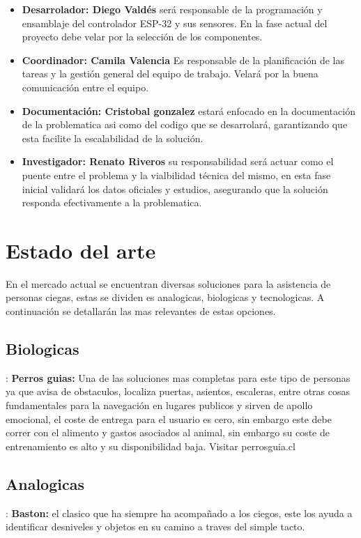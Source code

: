 \documentclass{article}
\begin{document}
    \begin{itemize}
        \item\textbf{Desarrolador: Diego Valdés} será responsable de la programación y ensamblaje del controlador ESP-32 y sus sensores. En la fase actual del proyecto debe velar por la selección de los componentes.
        \item\textbf{Coordinador: Camila Valencia} Es responsable de la planificación de las tareas y la gestión general del equipo de trabajo. Velará por la buena comunicación entre el equipo.
        \item\textbf{Documentación: Cristobal gonzalez} estará enfocado en la documentación de la problematica asi como del codigo que se desarrolará, garantizando que esta facilite la escalabilidad de la solución.
        \item\textbf{Investigador: Renato Riveros} su responsabilidad será actuar como el puente entre el problema y la vialbilidad técnica del mismo, en esta fase inicial validará los datos oficiales y estudios, asegurando que la solución responda efectivamente a la problematica.
    \end{itemize}


    \newpage
    \section{Estado del arte}
    En el mercado actual se encuentran diversas soluciones para la asistencia de personas ciegas, estas se dividen es analogicas, biologicas y tecnologicas. A continuación se detallarán las mas relevantes de estas opciones.
    
        \subsection{Biologicas}:
            \textbf{Perros guias:} Una de las soluciones mas completas para este tipo de personas ya que avisa de obstaculos, localiza puertas, asientos, escaleras, entre otras cosas fundamentales para la navegación en lugares publicos y sirven de apollo emocional,
            el coste de entrega para el usuario es cero, sin embargo este debe correr con el alimento y gastos asociados al animal, sin embargo su coste de entrenamiento es alto y su disponibilidad baja.  Visitar perrosguia.cl

        \subsection{Analogicas}:
            \textbf{Baston:} el clasico que ha siempre ha acompañado a los ciegos, este los ayuda a identificar desniveles y objetos en su camino a traves del simple tacto.
\end{document}
